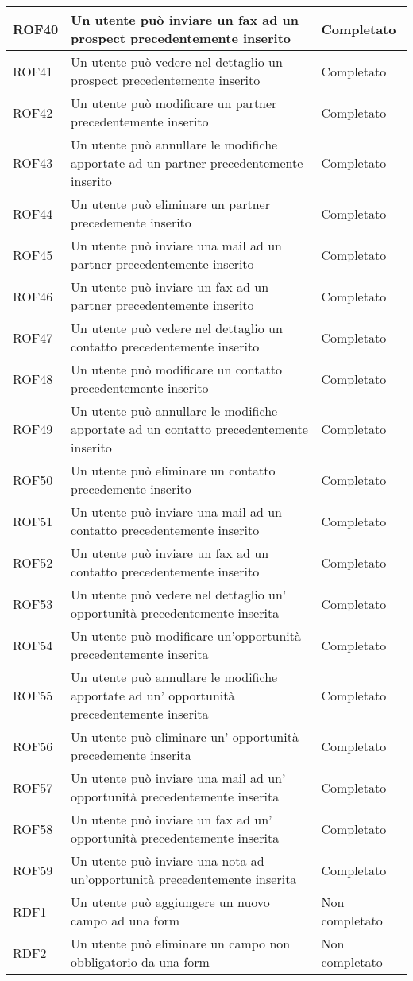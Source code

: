\begin{longtable}[H]{|p{3cm}|p{8cm}|p{3cm}|}
	\hline
	ROF40&Un utente può inviare un fax ad un prospect precedentemente inserito&Completato \\
	\hline
	ROF41&Un utente può vedere nel dettaglio un prospect precedentemente inserito&Completato\\
	\hline
	ROF42&Un utente può modificare un partner precedentemente inserito&Completato\\
	\hline
	ROF43&Un utente può annullare le modifiche apportate ad un partner precedentemente inserito&Completato\\
	\hline
	ROF44&Un utente può eliminare un partner precedemente inserito&Completato\\
	\hline
	ROF45&Un utente può inviare una mail ad un partner precedentemente inserito&Completato \\
	\hline
	ROF46&Un utente può inviare un fax ad un partner precedentemente inserito&Completato \\
	\hline
	ROF47&Un utente può vedere nel dettaglio un contatto precedentemente inserito&Completato\\
	\hline
	ROF48&Un utente può modificare un contatto precedentemente inserito&Completato\\
	\hline
	ROF49&Un utente può annullare le modifiche apportate ad un contatto precedentemente inserito&Completato\\
	\hline
	ROF50&Un utente può eliminare un contatto precedemente inserito&Completato\\
	\hline
	ROF51&Un utente può inviare una mail ad un contatto precedentemente inserito&Completato \\
	\hline
	ROF52&Un utente può inviare un fax ad un contatto precedentemente inserito&Completato \\
	\hline
	ROF53&Un utente può vedere nel dettaglio un' opportunità precedentemente inserita&Completato\\
	\hline
	ROF54&Un utente può modificare un'opportunità precedentemente inserita&Completato\\
	\hline
	ROF55&Un utente può annullare le modifiche apportate ad un' opportunità precedentemente inserita&Completato\\
	\hline
	ROF56&Un utente può eliminare un' opportunità precedemente inserita&Completato\\
	\hline
	ROF57&Un utente può inviare una mail ad un' opportunità precedentemente inserita&Completato \\
	\hline
	ROF58&Un utente può inviare un fax ad un' opportunità precedentemente inserita&Completato \\
	\hline
	ROF59&Un utente può inviare una nota ad un'opportunità precedentemente inserita& Completato\\
	\hline
	RDF1&Un utente può aggiungere un nuovo campo ad una form&Non completato\\
	\hline
	RDF2&Un utente può eliminare un campo non obbligatorio da una form& Non completato \\
	\hline
	
\end{longtable}



